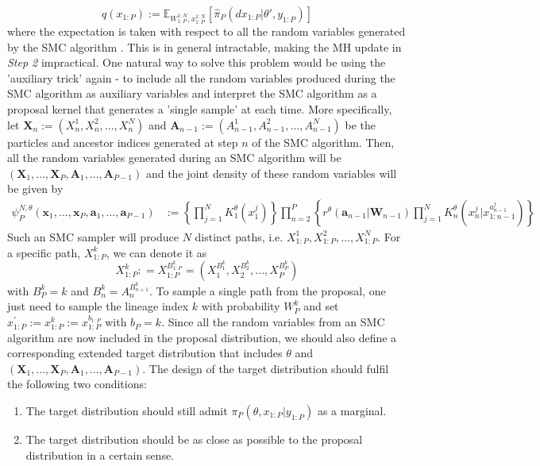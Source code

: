 \documentclass[12pt,a4paper]{article}
\begin{document}
\begin{equation}
    q(x_{1:P}) := \mathbb{E}_{W_{1:P}^{1:N},x_{1:P}^{1:N}}\left[\hat{\pi}_P(dx_{1:P}|\theta',y_{1:P})\right]
\end{equation}
where the expectation is taken with respect to all the random variables generated by the SMC algorithm \citep{andrieu2010particle}. This is in general intractable, making the MH update in \textit{Step 2} impractical. One natural way to solve this problem would be using the 'auxiliary trick' again - to include all the random variables produced during the SMC algorithm as auxiliary variables and interpret the SMC algorithm as a proposal kernel that generates a 'single sample' at each time. More specifically, let $\mathbf{X}_n := \left(X_n^1,X_n^2,...,X_n^N\right)$ and $\mathbf{A}_{n-1}:=\left(A_{n-1}^1,A_{n-1}^2,...,A_{n-1}^N\right)$ be the particles and ancestor indices generated at step $n$ of the SMC algorithm. Then, all the random variables generated during an SMC algorithm will be $\left(\mathbf{X}_1,...,\mathbf{X}_P,\mathbf{A}_1,...,\mathbf{A}_{P-1}\right)$ and the joint density of these random variables will be given by 
\begin{equation}
    \label{JointDensity-of-SMC}
    \begin{split}
        \psi_P^{N,\theta}(\textbf{x}_1,...,\textbf{x}_P,\textbf{a}_1,...,\textbf{a}_{P-1}) & := \left\{\prod_{j=1}^{N}K_1^{\theta}\left(x_1^j\right)\right\}\prod_{n=2}^{P}\left\{r^{\theta}\left(\textbf{a}_{n-1}|\textbf{W}_{n-1}\right)\prod_{j=1}^{N}K_n^{\theta}\left(x_n^j|x_{1:n-1}^{a_{n-1}^j}\right)\right\}
    \end{split}
\end{equation}
Such an SMC sampler will produce $N$ distinct paths, i.e. $X_{1:P}^1, X_{1:P}^2,...,X_{1:P}^N$. For a specific path, $X_{1:P}^k$, we can denote it as 
$$X_{1:P}^k : = X_{1:P}^{B_{1:P}^k}=\left(X_1^{B_1^k},X_2^{B_2^k},...,X_P^{B_P^k}\right)$$
with $B_P^k = k$ and $B_n^k = A_{n}^{B_{n+1}^k}$. To sample a single path from the proposal, one just need to sample the lineage index $k$ with probability $W_P^k$ and set $x_{1:P}^{'}:= x_{1:P}^{k}:=x_{1:P}^{b_{1:P}}$ with $b_P = k$. Since all the random variables from an SMC algorithm are now included in the proposal distribution, we should also define a corresponding extended target distribution that includes $\theta$ and $\left(\mathbf{X}_1,...,\mathbf{X}_P,\mathbf{A}_1,...,\mathbf{A}_{P-1}\right)$. The design of the target distribution should fulfil the following two conditions:
\begin{enumerate}[label=\textit{Condition \arabic*.},leftmargin=*]
    \item The target distribution should still admit $\pi_P(\theta,x_{1:P}|y_{1:P})$ as a marginal.
    \item The target distribution should be as close as possible to the proposal distribution in a certain sense.
\end{enumerate}
\end{document}
